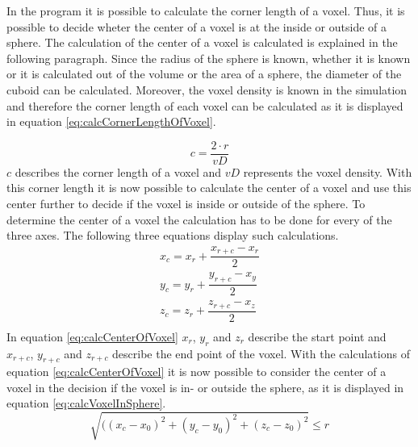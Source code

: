 In the program it is possible to calculate the corner length of a voxel. Thus, it is possible to decide wheter the center of a voxel is at the inside or outside of a sphere. The calculation of the center of a voxel is calculated is explained in the following paragraph. \newline
Since the radius of the sphere is known, whether it is known or it is calculated out of the volume or the area of a sphere, the diameter of the cuboid can be calculated. Moreover, the voxel density is known in the simulation and therefore the corner length of each voxel can be calculated as it is displayed in equation \ref{eq:calcCornerLengthOfVoxel}.

\begin{equation}\label{eq:calcCornerLengthOfVoxel}
c = \dfrac{2 \cdot r}{vD}
\end{equation}
$c$ describes the corner length of a voxel and $vD$ represents the voxel density. With this corner length it is now possible to calculate the center of a voxel and use this center further to decide if the voxel is inside or outside of the sphere. To determine the center of a voxel the calculation has to be done for every of the three axes. The following three equations display such calculations. 
\begin{equation}\label{eq:calcCenterOfVoxel}
\begin{split}
x_{c} = x_{r} + \dfrac{x_{r+c} - x_{r}}{2} \\
y_{c} = y_{r} + \dfrac{y_{r+c} - x_{y}}{2} \\
z_{c} = z_{r} + \dfrac{z_{r+c} - x_{z}}{2} \\
\end{split}
\end{equation}
In equation \ref{eq:calcCenterOfVoxel} $x_{r}$, $y_{r}$ and $z_{r}$ describe the start point and $x_{r+c}$, $y_{r+c}$ and $z_{r+c}$ describe the end point of the voxel.
With the calculations of equation \ref{eq:calcCenterOfVoxel} it is now possible to consider the center of a voxel in the decision if the voxel is in- or outside the sphere, as it is displayed in equation \ref{eq:calcVoxelInSphere}.
\begin{equation}\label{eq:calcVoxelInSphere}
\sqrt{((x_{c} - x_{0})^{2} + (y_{c} - y_{0})^{2} + (z_{c} -z_{0})^{2}} \leq r
\end{equation}



